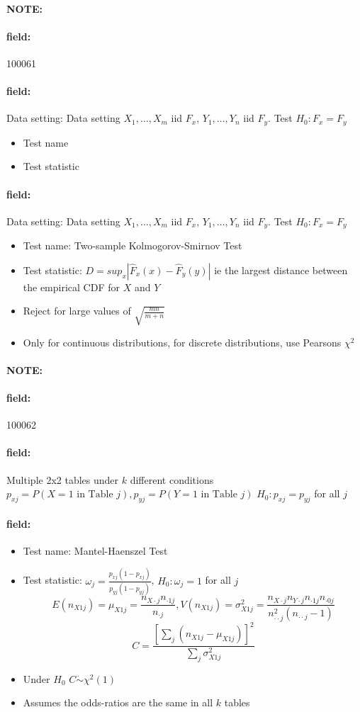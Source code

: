 \documentclass[12pt]{article}
\newenvironment{note}{\paragraph{NOTE:}}{}
\newenvironment{field}{\paragraph{field:}}{}
\begin{document}
\begin{note} \begin{field} \tiny 100061 \end{field}
 \begin{field}
  Data setting: Data setting $X_1, \ldots , X_m$ iid $F_x$, $Y_1, \ldots, Y_n$ iid $F_y$. Test $H_0: F_x = F_y$
  \begin{itemize}
   \item Test name
   \item Test statistic

  \end{itemize}
 \end{field}
 \begin{field}
  Data setting: Data setting $X_1, \ldots , X_m$ iid $F_x$, $Y_1, \ldots, Y_n$ iid $F_y$. Test $H_0: F_x = F_y$
  \begin{itemize}
   \item Test name: Two-sample Kolmogorov-Smirnov Test
   \item Test statistic: $D = sup_x|\hat{F}_x(x) - \hat{F}_y(y)|$ ie the largest distance between the empirical CDF for $X$ and $Y$
   \item Reject for large values of $\sqrt{\frac{mn}{m+n}}$
   \item Only for continuous distributions, for discrete distributions, use Pearsons $\chi^2$
  \end{itemize}
 \end{field}
\end{note}

\begin{note} \begin{field} \tiny 100062 \end{field}
 \begin{field}
  Multiple 2x2 tables under $k$ different conditions $p_{xj} = P(X = 1 \text{ in Table }j), p_{yj} = P(Y = 1 \text{ in Table }j)$ $H_0: p_{xj} = p_{yj}$ for all $j$
 \end{field}

 \begin{field}
  \begin{itemize}
   \item Test name: Mantel-Haenszel Test
   \item Test statistic: $\omega_j = \frac{p_{xj}(1 - p_{xj})}{p_{yj}(1 - p_{yj})}$, $H_0: \omega_j = 1$ for all $j$
         $$E(n_{X1j}) = \mu_{X1j} = \frac{n_{X\cdot j}n_{\cdot 1 j}}{n_{\cdot j}}, V(n_{X1j}) = \sigma^2_{X1j} = \frac{n_{X\cdot j}n_{Y\cdot j}n_{\cdot 1j} n_{\cdot 0j}}{n^2_{\cdot \cdot j}(n_{\cdot \cdot j} -1)} $$
         $$ C = \frac{[\sum_{j}(n_{X1j} - \mu_{X1j})]^2}{\sum_j \sigma^2_{X1j}}$$
   \item Under $H_0$ $C \dot\sim \chi^2(1)$
   \item Assumes the odds-ratios are the same in all $k$ tables
  \end{itemize}
 \end{field}
\end{note}
\end{document}
